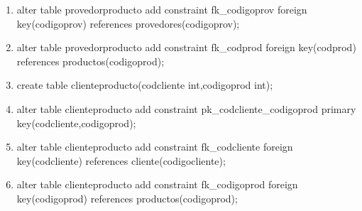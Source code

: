 \documentclass[10pt]{article}         %
\begin{document}
\begin{enumerate}
	\item
	alter table provedorproducto add constraint fk\_codigoprov foreign key(codigoprov) references provedores(codigoprov);
	\item
	alter table provedorproducto add constraint fk\_codprod foreign key(codprod) references productos(codigoprod);
	\item
	create table clienteproducto(codcliente int,codigoprod int);
	\item
	alter table clienteproducto add constraint pk\_codcliente\_codigoprod primary key(codcliente,codigoprod);
	\item
	alter table clienteproducto add constraint fk\_codcliente foreign key(codcliente) references cliente(codigocliente);
	\item
	alter table clienteproducto add constraint fk\_codigoprod foreign key(codigoprod) references productos(codigoprod);

	
\end{enumerate}
\end{document}
